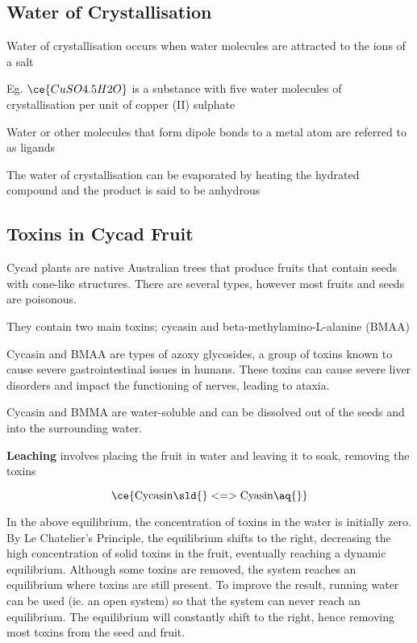 	\subsection{Water of Crystallisation}
		Water of crystallisation occurs when water molecules are attracted to the ions of a salt

		Eg. $\ce{CuSO4 . 5H2O}$ is a substance with five water molecules of crystallisation per unit of copper (II) sulphate

		Water or other molecules that form dipole bonds to a metal atom are referred to as ligands

		The water of crystallisation can be evaporated by heating the hydrated compound and the product is said to be anhydrous

	\subsection{Toxins in Cycad Fruit}
		Cycad plants are native Australian trees that produce fruits that contain seeds with cone-like structures. There are several types, however most fruits and seeds are poisonous.

		They contain two main toxins; cycasin and beta-methylamino-L-alanine (BMAA)

		Cycasin and BMAA are types of azoxy glycosides, a group of toxins known to cause severe gastrointestinal issues in humans. These toxins can cause severe liver disorders and impact the functioning of nerves, leading to ataxia.

		Cycasin and BMMA are water-soluble and can be dissolved out of the seeds and into the surrounding water.

		\textbf{Leaching} involves placing the fruit in water and leaving it to soak, removing the toxins

		$$\ce{\text{Cycasin} \sld{} <=> \text{Cyasin} \aq{}}$$

		In the above equilibrium, the concentration of toxins in the water is initially zero. By Le Chatelier's Principle, the equilibrium shifts to the right, decreasing the high concentration of solid toxins in the fruit, eventually reaching a dynamic equilibrium. Although some toxins are removed, the system reaches an equilibrium where toxins are still present. To improve the result, running water can be used (ie. an open system) so that the system can never reach an equilibrium. The equilibrium will constantly shift to the right, hence removing most toxins from the seed and fruit.


